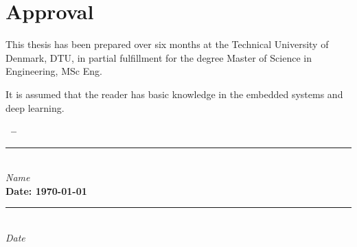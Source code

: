 \section*{Approval}
This thesis has been prepared over six months at the Technical University of Denmark, DTU, in partial fulfillment for the degree Master of Science in Engineering, MSc Eng. 

It is assumed that the reader has basic knowledge in the embedded systems and deep learning. 

\vfill

\begin{center}
    \textbf{\thesisauthor~--~\studentnumber} \\[2em]
    
    \rule{6cm}{0.4pt} \\
    \textit{Name} \\[2em]
    
    \textbf{Date: \today} \\
    \rule{6cm}{0.4pt} \\
    \textit{Date}
\end{center}

\vfill


